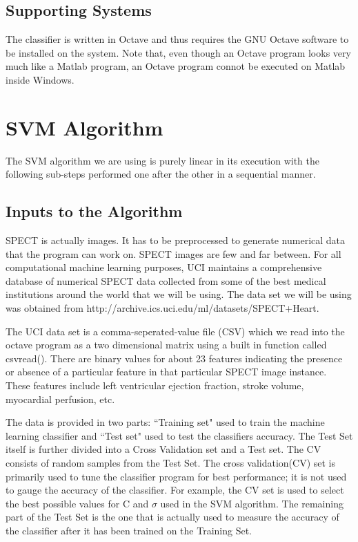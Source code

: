 \documentclass{acm_proc_article-sp}
\begin{document}
\subsection{Supporting Systems}

The classifier is written in Octave and thus requires the GNU Octave software to be installed on the system. Note that, even though an Octave program looks very much like a Matlab program, an Octave program connot be executed on Matlab inside Windows.

\section{SVM Algorithm}

The SVM algorithm we are using is purely linear in its execution with the following sub-steps performed one after the other in a sequential manner.

\subsection{Inputs to the Algorithm}

SPECT is actually images. It has to be preprocessed to generate numerical data that the program can work on. SPECT images are few and far between. For all computational machine learning purposes, UCI maintains a comprehensive database of numerical SPECT data collected from some of the best medical institutions around the world that we will be using. The data set we will be using was obtained from http://archive.ics.uci.edu/ml/datasets/SPECT+Heart. 

The UCI data set is a comma-seperated-value file (CSV) which we read into the octave program as a two dimensional matrix using a built in function called csvread(). There are binary values for about 23 features indicating the presence or absence of a particular feature in that particular SPECT image instance. These features include left ventricular ejection fraction, stroke volume, myocardial perfusion, etc. 

The data is provided in two parts: ``Training set" used to train the machine learning classifier and ``Test set" used to test the classifiers accuracy. The Test Set itself is further divided into a Cross Validation set and a Test set. The CV consists of random samples from the Test Set. The cross validation(CV) set is primarily used to tune the classifier program for best performance; it is not used to gauge the accuracy of the classifier. For example, the CV set is used to select the best possible values for C and $\sigma$ used in the SVM algorithm. The remaining part of the Test Set is the one that is actually used to measure the accuracy of the classifier after it has been trained on the Training Set. 
\end{document}
